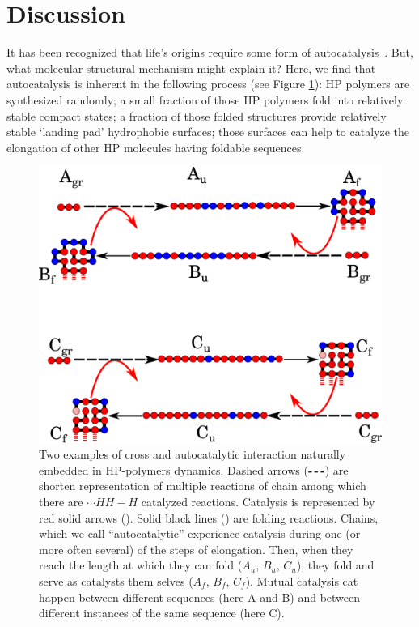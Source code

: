 \documentclass[5p,times]{elsarticle}
\newcommand*{\red}[1]{\textcolor{red}{#1}}
\begin{document}
\section{Discussion}
\label{sec:evolution}
 It has been recognized that life's origins require some form of 
autocatalysis~\cite{Kauffman1986,Dyson1985,Eigen1978}.  But, what molecular structural mechanism 
might explain it?  Here, we find that autocatalysis is inherent in the following process (see 
Figure \ref{fig:kinExamples}):  HP polymers 
are synthesized randomly; a small fraction of those HP polymers fold into relatively stable 
compact 
states; a fraction of those folded structures provide relatively stable `landing pad' hydrophobic 
surfaces; those surfaces can help to catalyze the elongation of other HP molecules having foldable 
sequences.
\begin{figure}[h!]
  \centering
  \includegraphics[width=0.9\columnwidth]{pictures/catalysis-kinEx-all.pdf}
  \caption{\footnotesize{Two examples of cross and autocatalytic interaction naturally embedded in 
HP-polymers dynamics. Dashed arrows (\textbf{-\,-\,-}) are shorten representation of multiple 
reactions of chain among which there are $\cdots HH - H$ catalyzed reactions. Catalysis is 
represented by red solid arrows (\red{\textbf{\textemdash}}). Solid black lines 
(\textbf{\textemdash}) are folding reactions. Chains, which we call ``autocatalytic'' experience 
catalysis during one (or more often several) of the steps of elongation. Then, when they reach the 
length at which they can fold ($A_u,\, B_u,\, C_u$), they fold and serve as catalysts them selves 
($A_f,\, B_f,\, C_f$). Mutual catalysis cat happen between different sequences (here A and B) and 
between different instances of the same sequence (here C).}}
  \label{fig:kinExamples}
\end{figure}
\end{document}
